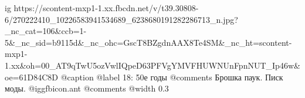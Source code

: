  
 
 
 
 

\ifcmt
  ig https://scontent-mxp1-1.xx.fbcdn.net/v/t39.30808-6/270222410_10226583941534689_6238680191282286713_n.jpg?_nc_cat=106&ccb=1-5&_nc_sid=b9115d&_nc_ohc=GscT8BZgdnAAX8Te4SM&_nc_ht=scontent-mxp1-1.xx&oh=00_AT9qTwU5ozVwlIQpeD63PFVgYMVFHUWNUnFpnNUT_Ip46w&oe=61D84C8D
	@caption @label 18: 50е годы
	@comments%
Брошка паук. Писк моды.  @igg{fbicon.ant} 
	@comments%
  @width 0.3
\fi
